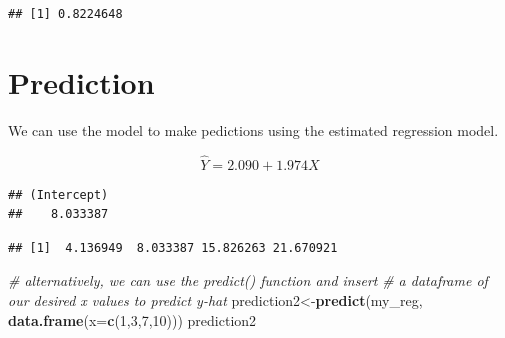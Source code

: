 \documentclass[]{book}
\newenvironment{Shaded}{\begin{snugshade}}{\end{snugshade}}
\newcommand{\KeywordTok}[1]{\textcolor[rgb]{0.13,0.29,0.53}{\textbf{#1}}}
\newcommand{\DataTypeTok}[1]{\textcolor[rgb]{0.13,0.29,0.53}{#1}}
\newcommand{\DecValTok}[1]{\textcolor[rgb]{0.00,0.00,0.81}{#1}}
\newcommand{\CommentTok}[1]{\textcolor[rgb]{0.56,0.35,0.01}{\textit{#1}}}
\newcommand{\OperatorTok}[1]{\textcolor[rgb]{0.81,0.36,0.00}{\textbf{#1}}}
\newcommand{\NormalTok}[1]{#1}
\theoremstyle{definition}
\theoremstyle{definition}
\theoremstyle{definition}
\theoremstyle{remark}
\begin{document}
\begin{verbatim}
## [1] 0.8224648
\end{verbatim}

\section{Prediction}\label{prediction}

We can use the model to make pedictions using the estimated regression
model.

\[\hat{Y}=2.090+1.974X\]

\begin{Shaded}
\end{Shaded}

\begin{verbatim}
## (Intercept) 
##    8.033387
\end{verbatim}

\begin{Shaded}
\end{Shaded}

\begin{verbatim}
## [1]  4.136949  8.033387 15.826263 21.670921
\end{verbatim}

\begin{Shaded}
\begin{Highlighting}[]
\CommentTok{# alternatively, we can use the predict() function and insert }
\CommentTok{# a dataframe of our desired x values to predict y-hat}
\NormalTok{prediction2<-}\KeywordTok{predict}\NormalTok{(my_reg, }\KeywordTok{data.frame}\NormalTok{(}\DataTypeTok{x=}\KeywordTok{c}\NormalTok{(}\DecValTok{1}\NormalTok{,}\DecValTok{3}\NormalTok{,}\DecValTok{7}\NormalTok{,}\DecValTok{10}\NormalTok{)))}
\NormalTok{prediction2}
\end{Highlighting}
\end{Shaded}
\end{document}
